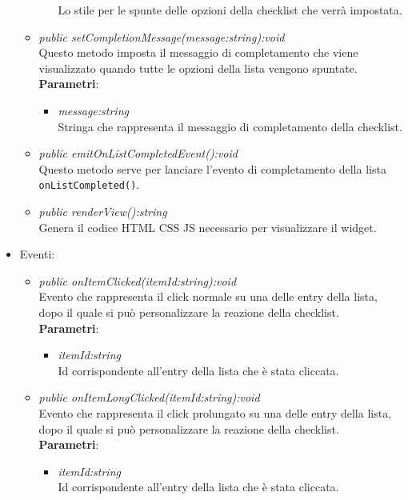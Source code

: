 \begin{itemize}
\begin{itemize}
\begin{itemize}
		Lo stile per le spunte delle opzioni della checklist che verrà impostata.
		\end{itemize}  
	\item \textit{public setCompletionMessage(message:string):void}\\
	Questo metodo imposta il messaggio di completamento che viene visualizzato quando tutte le opzioni della lista vengono spuntate.
		\\ \textbf{Parametri}: \begin{itemize}
		\item \textit{message:string}\\
		Stringa che rappresenta il messaggio di completamento della checklist.
		\end{itemize} 
	\item \textit{public emitOnListCompletedEvent():void}\\
	Questo metodo serve per lanciare l'evento di completamento della lista \texttt{onListCompleted()}.
	\item \textit{public renderView():string}\\
	Genera il codice HTML CSS JS necessario per visualizzare il widget.
	\end{itemize}
\item{Eventi}:
	\begin{itemize}
	\item \textit{public onItemClicked(itemId:string):void}\\
	Evento che rappresenta il click normale su una delle entry della lista, dopo il quale si può personalizzare la reazione della checklist.
		\\ \textbf{Parametri}: \begin{itemize}
		\item \textit{itemId:string}\\
		Id corrispondente all'entry della lista che è stata cliccata.
		\end{itemize} 
	\item \textit{public onItemLongClicked(itemId:string):void}\\
	Evento che rappresenta il click prolungato su una delle entry della lista, dopo il quale si può personalizzare la reazione della checklist.
		\\ \textbf{Parametri}: \begin{itemize}
		\item \textit{itemId:string}\\
		Id corrispondente all'entry della lista che è stata cliccata.
		\end{itemize} 
	\end{itemize}
\end{itemize}

